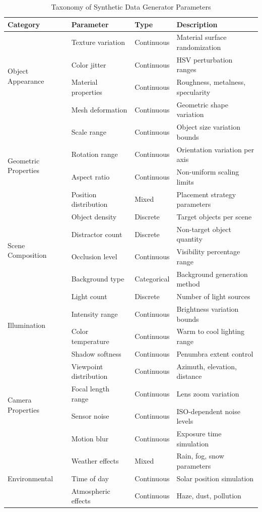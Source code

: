 \begin{table}[t]
\centering
\caption{Taxonomy of Synthetic Data Generator Parameters}
\label{tab:parameter_space}
\begin{tabular}{p{2.5cm}p{3.5cm}p{2cm}p{3.5cm}}
\hline
\textbf{Category} & \textbf{Parameter} & \textbf{Type} & \textbf{Description} \\
\hline
\multirow{4}{*}{Object Appearance}
& Texture variation & Continuous & Material surface randomization \\
& Color jitter & Continuous & HSV perturbation ranges \\
& Material properties & Continuous & Roughness, metalness, specularity \\
& Mesh deformation & Continuous & Geometric shape variation \\
\hline
\multirow{4}{*}{Geometric Properties}
& Scale range & Continuous & Object size variation bounds \\
& Rotation range & Continuous & Orientation variation per axis \\
& Aspect ratio & Continuous & Non-uniform scaling limits \\
& Position distribution & Mixed & Placement strategy parameters \\
\hline
\multirow{4}{*}{Scene Composition}
& Object density & Discrete & Target objects per scene \\
& Distractor count & Discrete & Non-target object quantity \\
& Occlusion level & Continuous & Visibility percentage range \\
& Background type & Categorical & Background generation method \\
\hline
\multirow{4}{*}{Illumination}
& Light count & Discrete & Number of light sources \\
& Intensity range & Continuous & Brightness variation bounds \\
& Color temperature & Continuous & Warm to cool lighting range \\
& Shadow softness & Continuous & Penumbra extent control \\
\hline
\multirow{4}{*}{Camera Properties}
& Viewpoint distribution & Continuous & Azimuth, elevation, distance \\
& Focal length range & Continuous & Lens zoom variation \\
& Sensor noise & Continuous & ISO-dependent noise levels \\
& Motion blur & Continuous & Exposure time simulation \\
\hline
\multirow{3}{*}{Environmental}
& Weather effects & Mixed & Rain, fog, snow parameters \\
& Time of day & Continuous & Solar position simulation \\
& Atmospheric effects & Continuous & Haze, dust, pollution \\
\hline
\end{tabular}
\end{table}

